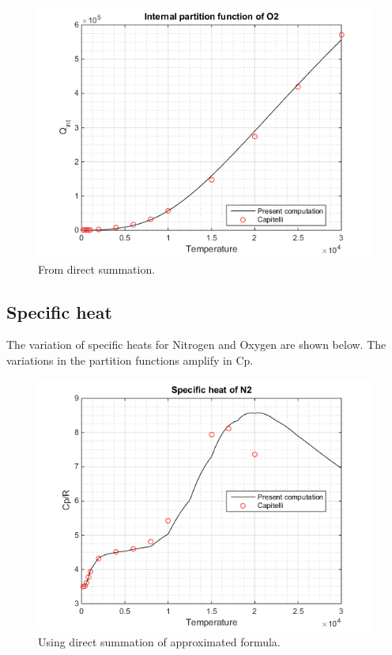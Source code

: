 \documentclass[]{aelab_aiaa-tc}%
\begin{document}
\begin{figure}[H!]%
	\includegraphics{QO2fig}
	\caption{From direct summation.}
\end{figure}


\subsection{Specific heat}

The variation of specific heats for Nitrogen and Oxygen are shown below. The variations in the partition functions amplify in Cp. 

\begin{figure}[h]%
	\includegraphics{CpN2fig}
	\caption{Using direct summation of approximated formula.}
\end{figure}
\end{document}
